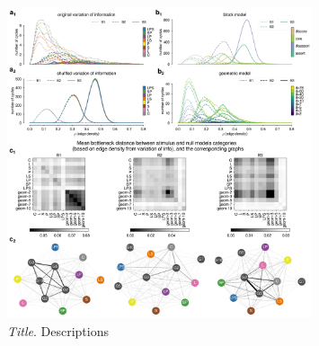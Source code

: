\begin{figure}[H]
    \centering
    \includegraphics[width=0.8\textwidth,center]{../figures/report/Fig3.png}
    \caption{\label{fig:3}
    \textit{Title}.
    Descriptions
    }
\end{figure}